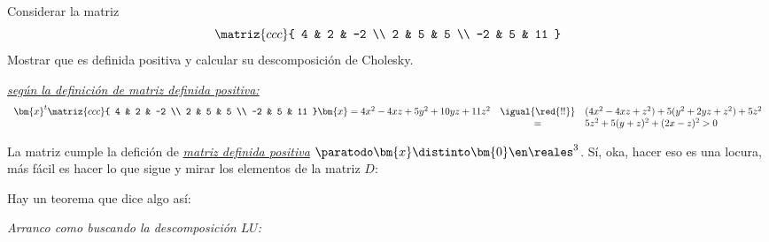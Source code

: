 \begin{enunciado}{\ejercicio}
  Considerar la matriz
  $$
    \matriz{ccc}{
      4 & 2 & -2 \\
      2 & 5 & 5 \\
      -2 & 5 & 11
    }
  $$
  Mostrar que es definida positiva y calcular su descomposición de Cholesky.
\end{enunciado}

\hyperlink{teoria-3:definida-positiva}{\textit{según la definición de matriz definida positiva:}}
$$
  \begin{array}{rcl}
    \bm{x}^t
    \matriz{ccc}{
    4  & 2                & -2                             \\
    2  & 5                & 5                              \\
    -2 & 5                & 11
    }
    \bm{x}
    = 4 x^2 - 4 x z + 5 y^2 + 10 y z  + 11 z^2
       & \igual{\red{!!}} &
    (4 x^2 - 4 x z + z^2) + 5( y^2 + 2 y z  +  z^2) + 5z^2 \\
       & =                & 5z^2 + 5(y+z)^2 + (2x-z)^2 > 0
  \end{array}
$$

La matriz cumple la defición de
\hyperlink{teoria-3:definida-positiva}{\textit{matriz definida positiva}} $\paratodo \bm{x}\distinto \bm{0} \en \reales^3$.
Sí, oka, hacer eso es una locura, más fácil es hacer lo que sigue y mirar los elementos de la matriz $D$:

Hay un teorema que dice algo así:

\textit{Arranco como buscando la descomposición $LU$:}

